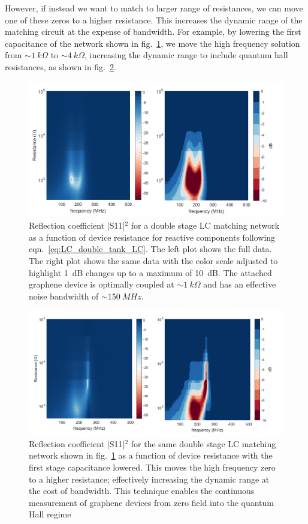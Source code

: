 However, if instead we want to match to larger range of resistances, we can move one of these zeros to a higher resistance. This increases the dynamic range of the matching circuit at the expense of bandwidth. For example, by lowering the first capacitance of the network shown in fig.~\ref{fig:S11vsR_double}, we move the high frequency solution from ${\sim}1~k\Omega$ to ${\sim}4~k\Omega$, increasing the dynamic range to include quantum hall resistances, as shown in fig.~\ref{fig:S11vsR_double2}.
\begin{figure}
\centering
\includegraphics[width=\textwidth]{figures/Johnson_noise_thermometry/S11vsR_double.png}
\caption{Reflection coefficient |S11|$^2$ for a double stage LC matching network as a function of device resistance for reactive components following eqn.~\ref{eq:LC_double_tank_LC}. The left plot shows the full data. The right plot shows the same data with the color scale adjusted to highlight 1~dB changes up to a maximum of 10~dB. The attached graphene device is optimally coupled at ${\sim}1~k\Omega$ and has an effective noise bandwidth of ${\sim}150~MHz$.}
\label{fig:S11vsR_double}
\end{figure}
\begin{figure}
\centering
\includegraphics[width=\textwidth]{figures/Johnson_noise_thermometry/S11vsR_double2.png}
\caption{Reflection coefficient |S11|$^2$ for the same  double stage LC matching network shown in fig.~\ref{fig:S11vsR_double} as a function of device resistance with the first stage capacitance lowered. This moves the high frequency zero to a higher resistance; effectively increasing the dynamic range at the cost of bandwidth. This technique enables the continuous measurement of graphene devices from zero field into the quantum Hall regime}
\label{fig:S11vsR_double2}
\end{figure}

